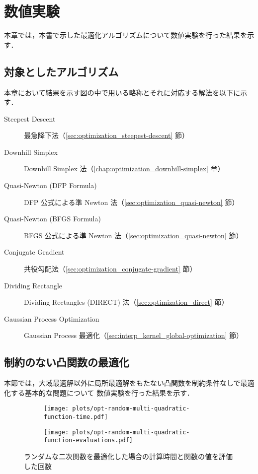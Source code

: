 %

\chapter{数値実験}

本章では，本書で示した最適化アルゴリズムについて数値実験を行った結果を示す．

\section{対象としたアルゴリズム}

本章において結果を示す図の中で用いる略称とそれに対応する解法を以下に示す．

\begin{description}
    \item[Steepest Descent] 最急降下法（\ref{sec:optimization_steepest-descent} 節）
    \item[Downhill Simplex] Downhill Simplex 法（\ref{chap:optimization_downhill-simplex} 章）
    \item[Quasi-Newton (DFP Formula)] DFP 公式による準 Newton 法（\ref{sec:optimization_quasi-newton} 節）
    \item[Quasi-Newton (BFGS Formula)] BFGS 公式による準 Newton 法（\ref{sec:optimization_quasi-newton} 節）
    \item[Conjugate Gradient] 共役勾配法（\ref{sec:optimization_conjugate-gradient} 節）
    \item[Dividing Rectangle] Dividing Rectangles (DIRECT) 法（\ref{sec:optimization_direct} 節）
    \item[Gaussian Process Optimization] Gaussian Process 最適化（\ref{sec:interp_kernel_global-optimization} 節）
\end{description}

\section{制約のない凸関数の最適化}

本節では，大域最適解以外に局所最適解をもたない凸関数を制約条件なしで最適化する基本的な問題について
数値実験を行った結果を示す．

\begin{figure}[tp]
    \centering
    \begin{subfigure}{0.85\linewidth}
        \centering
        \texttt{[image: plots/opt-random-multi-quadratic-function-time.pdf]}
    \end{subfigure}
    \begin{subfigure}{0.85\linewidth}
        \centering
        \texttt{[image: plots/opt-random-multi-quadratic-function-evaluations.pdf]}
    \end{subfigure}
    \caption{ランダムな二次関数を最適化した場合の計算時間と関数の値を評価した回数}
    \label{fig:optimization_unconstrained-convex-optimization_random-multi-quadratic-function}
\end{figure}

